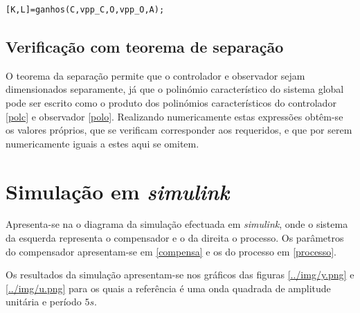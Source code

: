 \documentclass[%
  reprint,
  nofootinbib,
  amsmath,amssymb,
  aps,
  10pt,
  a4paper
]{revtex4-1}
\begin{document}
\begin{lstlisting}[label=list2, caption={Código Matlab para o cálculo dos ganhos $K$ do controlador e $L$ do observador a partir das matrizes de controlabilidade $\mathcal{C}$, observabilidade $\mathcal{O}$ e da dinâmica $A$, e os valores próprios desejados para o controlador $vpp\_C$ e observador $vpp\_O$. A função {\it ganhos} apresenta-se em anexo no ficheiro com o mesmo nome.}]
[K,L]=ganhos(C,vpp_C,O,vpp_O,A);
\end{lstlisting}
\subsection{Verificação com teorema de separação}
O teorema da separação permite que o controlador e observador sejam dimensionados separamente, já que o polinómio característico do sistema global pode ser escrito como o produto dos polinómios característicos do controlador \eqref{polc} e observador \eqref{polo}.
Realizando numericamente estas expressões obtêm-se os valores próprios, que se verificam corresponder aos requeridos, e que por serem numericamente iguais a estes aqui se omitem.



\section{Simulação em {\it simulink}}

Apresenta-se na  o diagrama da simulação efectuada em {\it simulink}, onde o sistema da esquerda representa o compensador e o da direita o processo. Os parâmetros do compensador apresentam-se em \eqref{compensa} e os do processo em \eqref{processo}.


Os resultados da simulação apresentam-se nos gráficos das figuras \ref{../img/y.png} e \ref{../img/u.png} para os quais a referência é uma onda quadrada de amplitude unitária e período $5s$.
\end{document}
